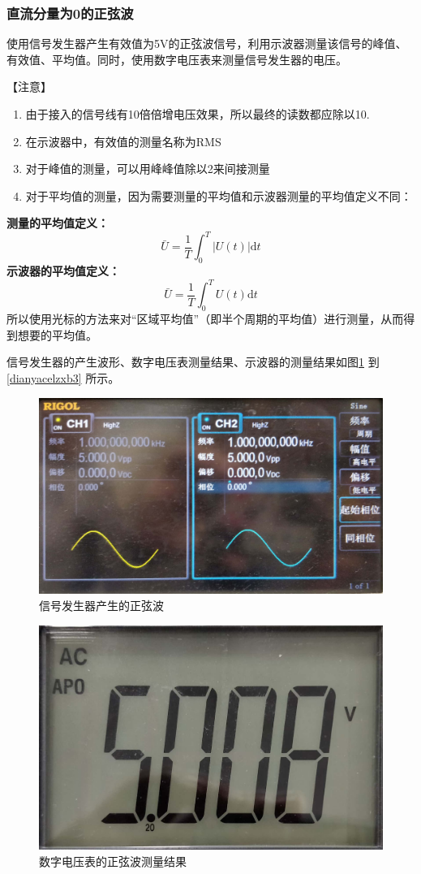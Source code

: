 \documentclass[12pt]{article}
\begin{document}
\subsubsection{直流分量为0的正弦波}
使用信号发生器产生有效值为5V的正弦波信号，利用示波器测量该信号的峰值、有效值、平均值。同时，使用数字电压表来测量信号发生器的电压。\par
【注意】
\begin{enumerate}
  \item 由于接入的信号线有10倍倍增电压效果，所以最终的读数都应除以10.
\item 在示波器中，有效值的测量名称为RMS
\item 对于峰值的测量，可以用峰峰值除以2来间接测量
\item 对于平均值的测量，因为需要测量的平均值和示波器测量的平均值定义不同：
\end{enumerate}
\textbf{测量的平均值定义：}
\begin{equation}\label{celiangpingjunzhi}
  \bar{U}=\frac{1}{T}\int_0^T\left|U(t)\right|\mbox{d}t
\end{equation}
\textbf{示波器的平均值定义：}
\begin{equation}\label{shiboqipingjunzhi}
  \bar{U}=\frac{1}{T}\int_0^TU(t)\mbox{d}t
\end{equation}
所以使用光标的方法来对“区域平均值”（即半个周期的平均值）进行测量，从而得到想要的平均值。\par
信号发生器的产生波形、数字电压表测量结果、示波器的测量结果如图\ref{dianyacelzxb1}
到\ref{dianyacelzxb3}
所示。
\begin{figure}[htbp]
    \centering
    \includegraphics[width=.5\textwidth]{P023}
    \caption{信号发生器产生的正弦波}\label{dianyacelzxb1}
  \end{figure}
  \begin{figure}[htbp]
    \centering
    \includegraphics[width=.5\textwidth]{P032}
    \caption{数字电压表的正弦波测量结果}\label{dianyacelzxb2}
  \end{figure}
\end{document}
